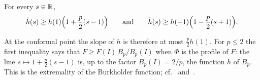 \begin{lemma}\label{lem:ends}
For every $s\in\mathbb{R}$,
\[
  \tilde h(s)\ge h(1)\Bigl(1+\frac p2(s-1)\Bigr)\qquad\text{and}\qquad
  \tilde h(s)\ge h(-1)\Bigl(1-\frac p2(s+1)\Bigr).
\]
\end{lemma}

At the conformal point the slope of $h$ is therefore at most $\tfrac p2h(1)$. For $p\le2$ the
first inequality says that $F\ge F(I)\,B_p/B_p(I)$ when $\Phi$ is the profile of $F$: the line
$s\mapsto1+\tfrac p2(s-1)$ is, up to the factor $B_p(I)=2/p$, the function $h$ of $B_p$. This is
the extremality of the Burkholder function; cf.~\cite[Theorem~4.2]{GuerraKristensen2022}
and~\cite{AIPS2015}.

